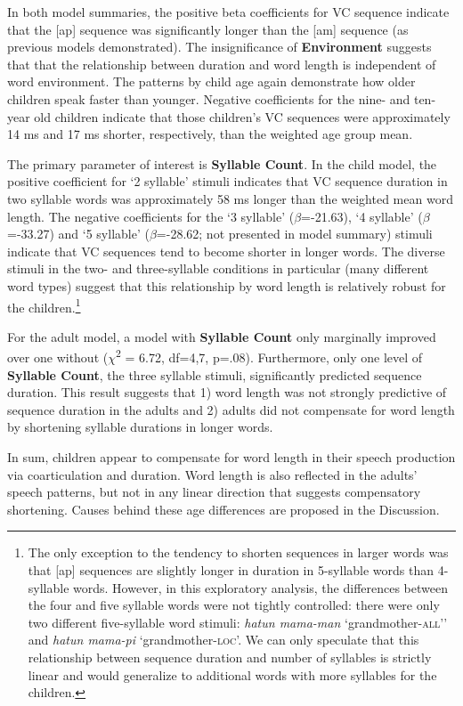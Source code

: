 \documentclass[
]{article}
\begin{document}
In both model summaries, the positive beta coefficients for VC sequence indicate that the {[}ap{]} sequence was significantly longer than the {[}am{]} sequence (as previous models demonstrated). The insignificance of \textbf{Environment} suggests that that the relationship between duration and word length is independent of word environment. The patterns by child age again demonstrate how older children speak faster than younger. Negative coefficients for the nine- and ten-year old children indicate that those children's VC sequences were approximately 14 ms and 17 ms shorter, respectively, than the weighted age group mean.

The primary parameter of interest is \textbf{Syllable Count}. In the child model, the positive coefficient for `2 syllable' stimuli indicates that VC sequence duration in two syllable words was approximately 58 ms longer than the weighted mean word length. The negative coefficients for the `3 syllable' (\(\beta\)=-21.63), `4 syllable' (\(\beta\)=-33.27) and `5 syllable' (\(\beta\)=-28.62; not presented in model summary) stimuli indicate that VC sequences tend to become shorter in longer words. The diverse stimuli in the two- and three-syllable conditions in particular (many different word types) suggest that this relationship by word length is relatively robust for the children.\footnote{The only exception to the tendency to shorten sequences in larger words was that {[}ap{]} sequences are slightly longer in duration in 5-syllable words than 4-syllable words. However, in this exploratory analysis, the differences between the four and five syllable words were not tightly controlled: there were only two different five-syllable word stimuli: \emph{hatun mama-man} `grandmother-\textsc{all}'' and \emph{hatun mama-pi} `grandmother-\textsc{loc}'. We can only speculate that this relationship between sequence duration and number of syllables is strictly linear and would generalize to additional words with more syllables for the children.}

For the adult model, a model with \textbf{Syllable Count} only marginally improved over one without (\(\chi\)\textsuperscript{2} = 6.72, df=4,7, p=.08). Furthermore, only one level of \textbf{Syllable Count}, the three syllable stimuli, significantly predicted sequence duration. This result suggests that 1) word length was not strongly predictive of sequence duration in the adults and 2) adults did not compensate for word length by shortening syllable durations in longer words.

In sum, children appear to compensate for word length in their speech production via coarticulation and duration. Word length is also reflected in the adults' speech patterns, but not in any linear direction that suggests compensatory shortening. Causes behind these age differences are proposed in the Discussion.
\end{document}
